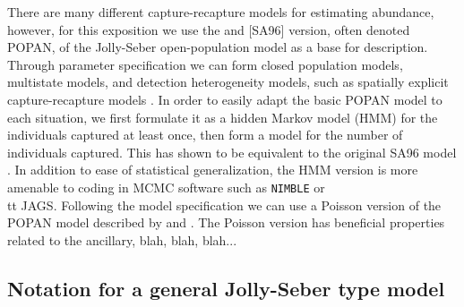 \documentclass[12pt]{article}
\begin{document}
There are many different capture-recapture models for estimating abundance, however, for this exposition we use the \cite{crosbie1985parsimonious} and \citet{schwarz1996general} [SA96] version, often denoted POPAN, of the Jolly-Seber \citep{xxx} open-population model as a base for description. Through parameter specification we can form closed population models, multistate models, and detection heterogeneity models, such as spatially explicit capture-recapture models \citep{efford2020spatial}. In order to easily adapt the basic POPAN model to each situation, we first formulate it as a hidden Markov model (HMM) for the individuals captured at least once, then form a model for the number of individuals captured. This has shown to be equivalent to the original SA96 model \citep{glennie2019open,mcclintock2020uncovering}. In addition to ease of statistical generalization, the HMM version is more amenable to coding in MCMC software such as {\tt NIMBLE} or {\\tt JAGS}. Following the model specification we can use a Poisson version of the POPAN model described by \cite{schofield201650} and \cite{schofield2023estimating}. The Poisson version has beneficial properties related to the ancillary, blah, blah, blah...

\subsection{Notation for a general Jolly-Seber type model}
\end{document}
